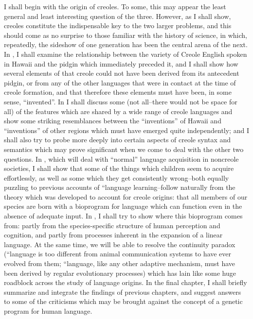 I shall begin with the origin of creoles. To some, this may appear the least general and least interesting question of the three. However, as I shall show, creoles constitute the indispensable key to the two larger problems, and this should come as no surprise to those familiar with the history of science, in which, repeatedly, the sideshow of one generation has been the central arena of the next. In , I shall examine the relationship between the variety of Creole English spoken in Hawaii and the pidgin which immediately preceded it, and I shall show how several elements of that creole could not have been derived from its antecedent pidgin, or from any of the other languages that were in contact at the time of creole formation, and that therefore these elements must have been, in some sense, ``invented''.  In  I shall discuss some (not all--there would not be space for all) of the features which are shared by a wide range of creole languages and show some striking resemblances between the ``inventions'' of Hawaii and ``inventions'' of other regions which must have emerged quite independently; and I shall also try to probe more deeply into certain aspects of creole syntax and semantics which may prove signifi\-cant when we come to deal with the other two questions. In , which will deal with ``normal'' language acquisition in noncreole societies, I shall show that some of the things which children seem to acquire effortlessly, as well as some which they get consistently wrong--both equally puzzling to previous accounts of ``language learning{\textquotedbl}--follow naturally from the theory which was developed to account for creole origins: that all members of our species are born with a bio\-program for language which can function even in the absence of ade\-quate input. In , I shall try to show where this bioprogram comes from: partly from the species-specific structure of human perception and cognition, and partly from processes inherent in the expansion of a linear language. At the same time, we will be able to resolve the continuity paradox (``language is too different from animal communication systems to have ever evolved from them{\textquotedbl}; ``language, like any other adaptive mechanism, must have been derived by regular evolutionary processes{\textquotedbl}) which has lain like some huge roadblock across the study of language origins. In the final chapter, I shall briefly summarize and integrate the findings of previous chapters, and suggest answers to some of the criticisms which may be brought against the concept of a genetic program for human language.